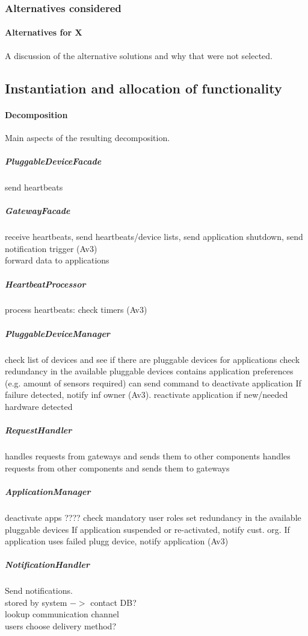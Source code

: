 \subsubsection{Alternatives considered}
    \paragraph{Alternatives for X}
    A discussion of the alternative solutions and why that were not selected.

\subsection{Instantiation and allocation of functionality}
    \paragraph{Decomposition}
    Main aspects of the resulting decomposition.

    \subparagraph{PluggableDeviceFacade}
    send heartbeats

    \subparagraph{GatewayFacade}
    receive heartbeats, send heartbeats/device lists, send application shutdown, send notification trigger (Av3)\\
    forward data to applications

    \subparagraph{HeartbeatProcessor}
    process heartbeats: check timers (Av3)

    \subparagraph{PluggableDeviceManager}
    check list of devices and see if there are pluggable devices for applications
    check redundancy in the available pluggable devices
    contains application preferences (e.g. amount of sensors required)
    can send command to deactivate application
    If failure detected, notify inf owner (Av3).
    reactivate application if new/needed hardware detected

    \subparagraph{RequestHandler}
    handles requests from gateways and sends them to other components
    handles requests from other components and sends them to gateways

    \subparagraph{ApplicationManager}
    deactivate apps
    ???? check mandatory user roles
    set redundancy in the available pluggable devices
    If application suspended or re-activated, notify cust. org.
    If application uses failed plugg device, notify application
    (Av3)

    \subparagraph{NotificationHandler}
    Send notifications. \\
    stored by system \(->\) contact DB? \\
    lookup communication channel \\
    users choose delivery method?

